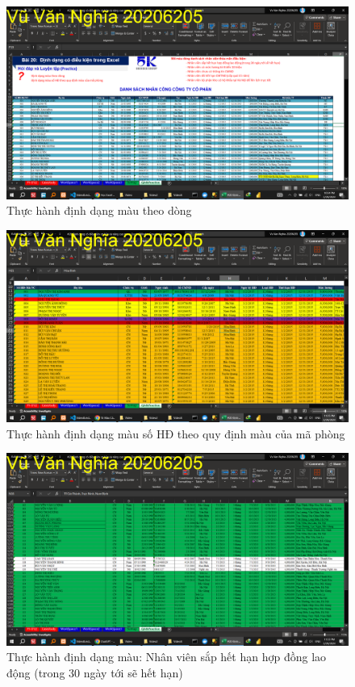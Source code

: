\documentclass{article}
\begin{document}
\begin{figure}[h]
\centering
\includegraphics[scale = 0.15]{Video8/ThucHanh/0.png}
\caption{Thực hành định dạng màu theo dòng}
\end{figure}
\begin{figure}[h]
\centering
\includegraphics[scale = 0.15]{Video8/ThucHanh/1.png}
\caption{Thực hành định dạng màu số HĐ theo quy định màu của mã phòng}
\end{figure}
\begin{figure}[h]
\centering
\includegraphics[scale = 0.15]{Video8/ThucHanh/2.png}
\caption{Thực hành định dạng màu: Nhân viên sắp hết hạn hợp đồng lao động (trong 30 ngày tới sẽ hết hạn)}
\end{figure}
\end{document}
